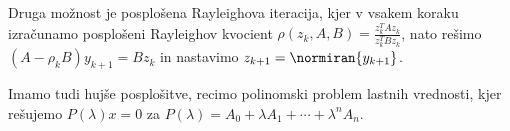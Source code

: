 Druga možnost je posplošena Rayleighova iteracija, kjer v vsakem koraku
izračunamo posplošeni Rayleighov kvocient $\rho(z_k,A,B) = \frac{z_k^T A
  z_k}{z_k^T B z_k}$, nato rešimo $(A - \rho_k B) y_{k+1} = B z_k$ in nastavimo
$z_{k+1} = \normiran{y_{k+1}}$.

Imamo tudi hujše posplošitve, recimo polinomski problem lastnih vrednosti, kjer
rešujemo $P(\lambda) x = 0$ za $P(\lambda) = A_0 + \lambda A_1 + \cdots +
\lambda^n A_n$.

